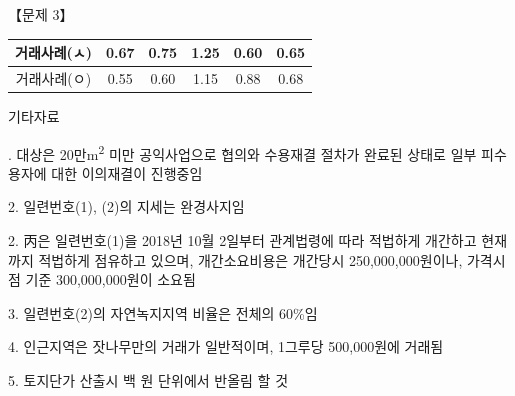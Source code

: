 \begin{longquestion}{【문제 3】}
{\begin{tabular}{|c|c|c|c|c|c|}
거래사례(ㅅ) & 0.67 & 0.75 & 1.25 & 0.60 & 0.65 \\\hline
거래사례(ㅇ) & 0.55 & 0.60 & 1.15 & 0.88 & 0.68 \\\hline
\end{tabular}\par}
\medskip{} 기타자료 \par
\medskip{}. 대상은 20만m\textsuperscript{2} 미만 공익사업으로 협의와 수용재결 절차가 완료된 상태로 일부 피수용자에 대한 이의재결이 진행중임 \par
2. 일련번호(1), (2)의 지세는 완경사지임 \par
2. 丙은 일련번호(1)을 2018년 10월 2일부터 관계법령에 따라 적법하게 개간하고 현재까지 적법하게 점유하고 있으며, 개간소요비용은 개간당시 250,000,000원이나, 가격시점 기준 300,000,000원이 소요됨 %
\par
3. 일련번호(2)의 자연녹지지역 비율은 전체의 60\%임 \par
4. 인근지역은 잣나무만의 거래가 일반적이며, 1그루당 500,000원에 거래됨 \par
5. 토지단가 산출시 백 원 단위에서 반올림 할 것 \par
\end{longquestion}

